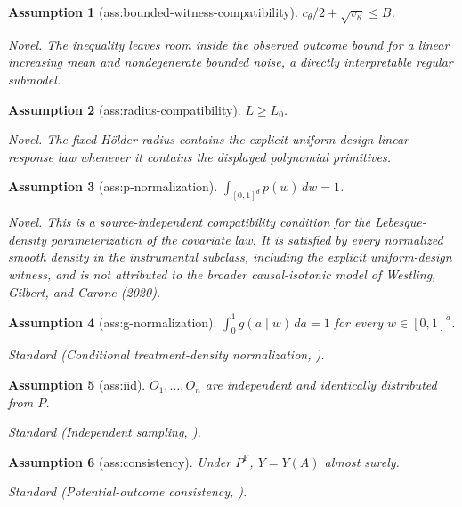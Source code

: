 \documentclass{article}
\newtheorem{assumption}{Assumption}
\begin{document}
\begin{assumption}[ass:bounded-witness-compatibility]\label{ass:bounded-witness-compatibility}
\(c_{\theta}/2+\sqrt{v_{\kappa}}\le B\).
\par\smallskip\noindent\emph{Novel.} The inequality leaves room inside the observed outcome bound for a linear increasing mean and nondegenerate bounded noise, a directly interpretable regular submodel.
\end{assumption}

\begin{assumption}[ass:radius-compatibility]\label{ass:radius-compatibility}
\(L\ge L_0\).
\par\smallskip\noindent\emph{Novel.} The fixed Hölder radius contains the explicit uniform-design linear-response law whenever it contains the displayed polynomial primitives.
\end{assumption}

\begin{assumption}[ass:p-normalization]\label{ass:p-normalization}
\(\int_{[0,1]^d}p(w)\,dw=1\).
\par\smallskip\noindent\emph{Novel.} This is a source-independent compatibility condition for the Lebesgue-density parameterization of the covariate law. It is satisfied by every normalized smooth density in the instrumental subclass, including the explicit uniform-design witness, and is not attributed to the broader causal-isotonic model of Westling, Gilbert, and Carone (2020).
\end{assumption}

\begin{assumption}[ass:g-normalization]\label{ass:g-normalization}
\(\int_0^1g(a\mid w)\,da=1\) for every \(w\in[0,1]^d\).
\par\smallskip\noindent\emph{Standard} (Conditional treatment-density normalization, \cite{WestlingGilbertCarone2020}).
\end{assumption}

\begin{assumption}[ass:iid]\label{ass:iid}
\(O_1,\ldots,O_n\) are independent and identically distributed from \(P\).
\par\smallskip\noindent\emph{Standard} (Independent sampling, \cite{WestlingGilbertCarone2020}).
\end{assumption}

\begin{assumption}[ass:consistency]\label{ass:consistency}
Under \(P^{\mathrm F}\), \(Y=Y(A)\) almost surely.
\par\smallskip\noindent\emph{Standard} (Potential-outcome consistency, \cite{WestlingGilbertCarone2020}).
\end{assumption}
\end{document}
